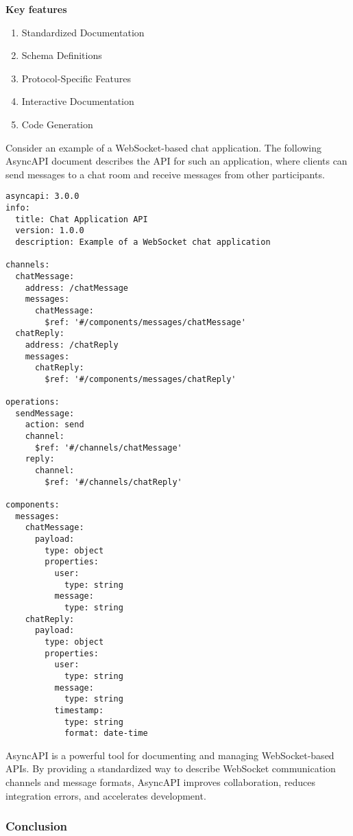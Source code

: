 \textbf{Key features}

\begin{enumerate}
  \item Standardized Documentation
  \item Schema Definitions
  \item Protocol-Specific Features
  \item Interactive Documentation
  \item Code Generation
\end{enumerate}

Consider an example of a WebSocket-based chat application. The following AsyncAPI document describes the API for such an application, where clients can send messages to a chat room and receive messages from other participants. \cite{asyncapi-docs}

\begin{lstlisting}[caption=EventSource listening to the topic]
asyncapi: 3.0.0
info:
  title: Chat Application API
  version: 1.0.0
  description: Example of a WebSocket chat application

channels:
  chatMessage:
    address: /chatMessage
    messages:
      chatMessage:
        $ref: '#/components/messages/chatMessage'
  chatReply:
    address: /chatReply
    messages:
      chatReply:
        $ref: '#/components/messages/chatReply'

operations:
  sendMessage:
    action: send
    channel:
      $ref: '#/channels/chatMessage'
    reply:
      channel:
        $ref: '#/channels/chatReply'

components:
  messages:
    chatMessage:
      payload:
        type: object
        properties:
          user:
            type: string
          message:
            type: string
    chatReply:
      payload:
        type: object
        properties:
          user:
            type: string
          message:
            type: string
          timestamp:
            type: string
            format: date-time
\end{lstlisting}

AsyncAPI is a powerful tool for documenting and managing WebSocket-based APIs. By providing a standardized way to describe WebSocket communication channels and message formats, AsyncAPI improves collaboration, reduces integration errors, and accelerates development.

\subsubsection{Conclusion}

